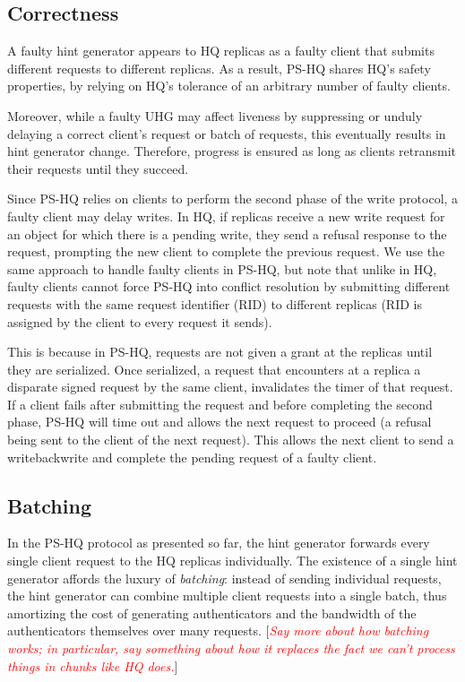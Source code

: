 \documentclass[twocolumn,10pt]{article}
\newcommand{\note}[1]{[\textcolor{red}{\textit{#1}}]}
\begin{document}
\subsection{Correctness}

A faulty hint generator appears to HQ replicas as a faulty client that
submits different requests to different replicas.  As a result, PS-HQ
shares HQ's safety properties, by relying on HQ's tolerance of an
arbitrary number of faulty clients.  

Moreover, while a faulty UHG may affect liveness by
suppressing or unduly delaying a correct client's request or batch of
requests, this eventually results in hint generator change.
Therefore, progress is ensured as long as clients retransmit their
requests until they succeed.  

Since PS-HQ relies on clients to perform the second phase of the write
protocol, a faulty client may delay writes. In HQ, if replicas receive
a new write request for an object for which there is a pending write,
they send a refusal response to the request, prompting the new client
to complete the previous request.  We use the same approach to handle
faulty clients in PS-HQ, but note that unlike in HQ, faulty clients
cannot force PS-HQ into conflict resolution by submitting different
requests with the same request identifier (RID) to different replicas 
(RID is assigned by the client to every request it sends). 

This is because in PS-HQ, requests are not given a grant at the
replicas until they are serialized.  Once serialized, a request that
encounters at a replica a disparate signed request by the same client,
invalidates the timer of that request. If a client fails after
submitting the request and before completing the second phase, PS-HQ
will time out and allows the next request to proceed (a refusal being
sent to the client of the next request). This allows the next client
to send a writebackwrite and complete the pending request of a faulty
client.


\subsection{Batching}

In the PS-HQ protocol as presented so far, the hint generator forwards
every single client request to the HQ replicas individually.  The
existence of a single hint generator affords the luxury of
\emph{batching}: instead of sending individual requests, 
the hint generator can combine multiple client
requests into a single batch, thus amortizing the cost of generating
authenticators and the bandwidth of the authenticators themselves over
many requests.  \note{Say more about how batching works; in
  particular, say something about how it replaces the fact we can't
  process things in chunks like HQ does.}
\end{document}
